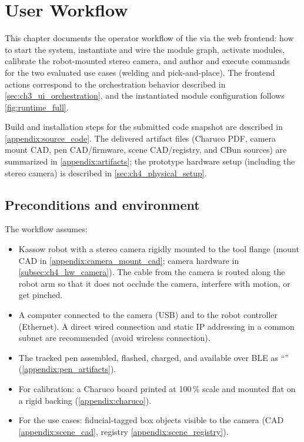 \chapter{User Workflow}
\label{chapter:ch5_user_workflow}

This chapter documents the operator workflow of the \DIFdelbegin {}\DIFdelend \DIFaddbegin {}\DIFaddend via the web frontend: how to start the system, instantiate and wire the module graph, activate modules, calibrate the robot-mounted stereo camera, and author and execute commands for the two evaluated use cases (welding and pick-and-place).
The frontend actions correspond to the orchestration behavior described in \autoref{sec:ch3_ui_orchestration}, and the instantiated module configuration follows \autoref{fig:runtime_full}.

Build and installation steps for the submitted code snapshot are described in \autoref{appendix:source_code}.
The delivered artifact files (Charuco PDF, camera mount CAD, pen CAD/firmware, scene CAD/registry, and CBun sources) are summarized in \autoref{appendix:artifacts};
the prototype hardware setup (including the stereo camera) is described in \autoref{sec:ch4_physical_setup}.




\section{Preconditions and environment}
\label{sec:ch5_preconditions}

The workflow assumes:
\begin{itemize}
  \item Kassow robot with a stereo camera rigidly mounted to the tool flange (mount CAD in \autoref{appendix:camera_mount_cad}; camera hardware in \autoref{subsec:ch4_hw_camera}).
        The cable from the camera is routed along the robot arm so that it does not occlude the camera, interfere with motion, or get pinched.
  \item A computer connected to the camera (USB) and to the robot controller (Ethernet). A direct wired connection and static IP addressing in a common subnet are recommended (avoid wireless connection).
  \item The tracked pen assembled, flashed, charged, and available over BLE as ``'' (\autoref{appendix:pen_artifacts}).
  \item For calibration: a Charuco board printed at 100\,\% scale and mounted flat on a rigid backing (\autoref{appendix:charuco}).
  \item For the use cases: fiducial-tagged box objects visible to the camera (CAD \autoref{appendix:scene_cad}, registry \autoref{appendix:scene_registry}).
\end{itemize}

